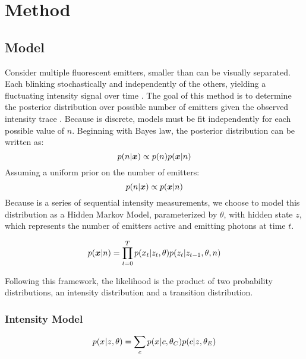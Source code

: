\section{Method}

\subsection{Model}
Consider multiple fluorescent emitters, smaller than can be visually separated.
  Each blinking stochastically and independently of the others, 
  yielding a fluctuating intensity signal over time .
  The goal of this method is to determine the posterior distribution over 
  possible number of emitters \ndist given the observed intensity trace \trace.
  Because \ndist is discrete, models must be fit independently for each possible value of $n$.
  Beginning with Bayes law, the posterior distribution can be written as:
  \begin{equation*}
    p(n | \bm{x}) \propto p(n) p(\bm{x} | n)
  \end{equation*}
  Assuming a uniform prior on the number of emitters:
  \begin{equation*}
    p(n | \bm{x}) \propto p(\bm{x} | n)
  \end{equation*}
  Because \trace is a series of sequential intensity measurements, 
    we choose to model this distribution as a Hidden Markov Model, parameterized by $\theta$,
     with hidden state $z$, which represents the number of emitters active and emitting photons at time $t$.
    

  \begin{equation}
    p(\bm{x}| n) = \prod_{t=0}^{T} p(x_{t} | z_{t}, \theta) p(z_{t} | z_{t-1}, \theta, n)
    \label{eq:method:HMM}
  \end{equation}

  Following this framework, the likelihood is the product of two probability distributions,
  an intensity distribution and a transition distribution. 

\subsubsection{Intensity Model}

\begin{equation}
  p(x_{}|z_{},\theta) = \sum_c p(x_{}|c,\theta_C)p(c|z_{},\theta_E)
\end{equation}

